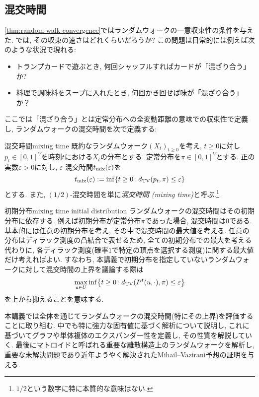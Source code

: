 \subsection{混交時間}
\cref{thm:random walk convergence}ではランダムウォークの一意収束性の条件を与えた.
では, その収束の速さはどれくらいだろうか?
この問題は日常的には例えば次のような状況で現れる:
\begin{itemize}
  \item トランプカードで遊ぶとき, 何回シャッフルすればカードが「混ざり合う」か?
  \item 料理で調味料をスープに入れたとき, 何回かき回せば味が「混ざり合う」か？
\end{itemize}

ここでは「混ざり合う」とは定常分布への全変動距離の意味での収束性で定義し,
ランダムウォークの混交時間を次で定義する:
\begin{definition}{混交時間}{mixing time}
  既約なランダムウォーク$(X_t)_{t\ge 0}$を考え, $t\ge 0$に対し
  $p_t \in [0,1]^V$を時刻$t$における$X_t$の分布とする.
  定常分布を$\pi \in [0,1]^V$とする.
  正の実数$\varepsilon > 0$に対し, $\varepsilon$-混交時間$t_{\mathrm{mix}}(\varepsilon)$を
  \[
    \tmix(\varepsilon) \defeq \inf\cbra*{ t \ge 0 \colon \dtv(p_t, \pi) \le \varepsilon}
  \]
  とする.
  また, $(1/2)$-混交時間を単に\emph{混交時間 (mixing time)}と呼ぶ.\footnote{$1/2$という数字に特に本質的な意味はない.}
\end{definition}
\begin{remark}{初期分布}{mixing time initial distribution}
  ランダムウォークの混交時間はその初期分布に依存する.
  例えば初期分布が定常分布$\pi$であった場合, 混交時間は$0$である.
  基本的には任意の初期分布を考え, その中で混交時間の最大値を考える.
  任意の分布はディラック測度の凸結合で表せるため,
  全ての初期分布での最大を考える代わりに,
  各ディラック測度(確率$1$で特定の頂点を選択する測度)に関する最大値だけ考えればよい.
  すなわち, 本講義で初期分布を指定していないランダムウォークに対して混交時間の上界を議論する際は
  \[
    \max_{u\in U} \inf\cbra*{ t\ge 0 \colon \dtv(P^t(u,\cdot),\pi) \le \varepsilon }
  \]
  を上から抑えることを意味する.
\end{remark}

本講義では全体を通じてランダムウォークの混交時間(特にその上界)を評価することに取り組む.
中でも特に強力な固有値に基づく解析について説明し,
これに基づいてグラフや単体複体のエクスパンダー性を定義し, その性質を解説していく.
最後にマトロイドと呼ばれる重要な離散構造上のランダムウォークを解析し,
重要な未解決問題であり近年ようやく解決されたMihail--Vazirani予想の証明を与える.

